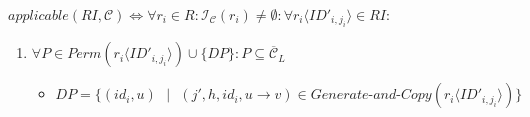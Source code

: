 \documentclass{article}
\newcommand{\s}{\text{ }}
\newcommand{\mn}{\text{-}}
\newcommand{\la}{\langle}
\newcommand{\ra}{\rangle}
\begin{document}
$applicable(RI, \mathcal{C}) \Leftrightarrow \forall r_i \in R: \mathcal{I}_{\mathcal{C}}(r_i) 
\neq \emptyset: \forall r_i\la ID'_{i,j_i}\ra \in RI:$

\begin{enumerate}
\item $\forall P \in Perm(r_i\la ID'_{i,j_i}\ra) \cup \{DP\}: P \subseteq \overline{\mathcal{C}}_L$
      \begin{itemize}
      \item $DP = \{(id_i,u)\s |\s (j', h, id_i, u \rightarrow v) \in 
            Generate\mn and\mn Copy(r_i\la ID'_{i,j_i}\ra)\}$
      \end{itemize}



\end{enumerate}
\end{document}
